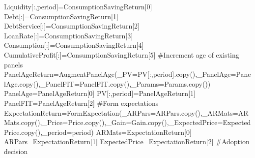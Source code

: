 \documentclass[
  letterpaper,
  DIV=11,
  numbers=noendperiod]{scrartcl}
\newenvironment{Shaded}{\begin{snugshade}}{\end{snugshade}}
\newcommand{\CommentTok}[1]{\textcolor[rgb]{0.37,0.37,0.37}{#1}}
\newcommand{\DecValTok}[1]{\textcolor[rgb]{0.68,0.00,0.00}{#1}}
\newcommand{\NormalTok}[1]{\textcolor[rgb]{0.00,0.23,0.31}{#1}}
\newcommand{\OperatorTok}[1]{\textcolor[rgb]{0.37,0.37,0.37}{#1}}
\begin{document}
\begin{Shaded}
\begin{Highlighting}[]
\NormalTok{        Liquidity[:,period]}\OperatorTok{=}\NormalTok{ConsumptionSavingReturn[}\DecValTok{0}\NormalTok{]}
\NormalTok{        Debt[:]}\OperatorTok{=}\NormalTok{ConsumptionSavingReturn[}\DecValTok{1}\NormalTok{]}
\NormalTok{        DebtService[:]}\OperatorTok{=}\NormalTok{ConsumptionSavingReturn[}\DecValTok{2}\NormalTok{]}
\NormalTok{        LoanRate[:]}\OperatorTok{=}\NormalTok{ConsumptionSavingReturn[}\DecValTok{3}\NormalTok{]}
\NormalTok{        Consumption[:]}\OperatorTok{=}\NormalTok{ConsumptionSavingReturn[}\DecValTok{4}\NormalTok{]}
\NormalTok{        CumulativeProfit[:]}\OperatorTok{=}\NormalTok{ConsumptionSavingReturn[}\DecValTok{5}\NormalTok{]}
        \CommentTok{\#Increment age of existing panels}
\NormalTok{        PanelAgeReturn}\OperatorTok{=}\NormalTok{AugmentPanelAge(\_PV}\OperatorTok{=}\NormalTok{PV[:,period].copy(),\_PanelAge}\OperatorTok{=}\NormalTok{PanelAge.copy(),\_PanelFIT}\OperatorTok{=}\NormalTok{PanelFIT.copy(),\_Params}\OperatorTok{=}\NormalTok{Params.copy())}
\NormalTok{        PanelAge}\OperatorTok{=}\NormalTok{PanelAgeReturn[}\DecValTok{0}\NormalTok{]}
\NormalTok{        PV[:,period]}\OperatorTok{=}\NormalTok{PanelAgeReturn[}\DecValTok{1}\NormalTok{]}
\NormalTok{        PanelFIT}\OperatorTok{=}\NormalTok{PanelAgeReturn[}\DecValTok{2}\NormalTok{]}
        \CommentTok{\#Form expectations}
\NormalTok{        ExpectationReturn}\OperatorTok{=}\NormalTok{FormExpectation(\_ARPars}\OperatorTok{=}\NormalTok{ARPars.copy(),\_ARMats}\OperatorTok{=}\NormalTok{ARMats.copy(),\_Price}\OperatorTok{=}\NormalTok{Price.copy(),\_Gain}\OperatorTok{=}\NormalTok{Gain.copy(),\_ExpectedPrice}\OperatorTok{=}\NormalTok{ExpectedPrice.copy(),\_period}\OperatorTok{=}\NormalTok{period)}
\NormalTok{        ARMats}\OperatorTok{=}\NormalTok{ExpectationReturn[}\DecValTok{0}\NormalTok{]}
\NormalTok{        ARPars}\OperatorTok{=}\NormalTok{ExpectationReturn[}\DecValTok{1}\NormalTok{]}
\NormalTok{        ExpectedPrice}\OperatorTok{=}\NormalTok{ExpectationReturn[}\DecValTok{2}\NormalTok{]}
        \CommentTok{\#Adoption decision}

\end{Highlighting}
\end{Shaded}
\end{document}
